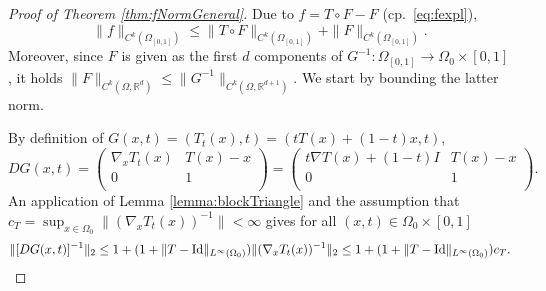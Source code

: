 \begin{proof}[Proof of Theorem \ref{thm:fNormGeneral}]
  Due to $f=T\circ F-F$ (cp.~\eqref{eq:fexpl}),
  \begin{equation}\label{eq:ftriangle}
    \|f\|_{C^k(\Omega_{[0,1]})} \leq \|T\circ F\|_{C^k(\Omega_{[0,1]})} + \|F\|_{C^k(\Omega_{[0,1]})}.
  \end{equation}
  Moreover, since $F$ is given as the first $d$ components of
  $G^{-1}:\Omega_{[0,1]}\to\Omega_0\times [0,1]$, it holds
  $\|F\|_{C^k(\Omega, \mathbb{R}^d)} \leq
  \|G^{-1}\|_{C^k(\Omega,\mathbb{R}^{d+1})}$.
  We start by bounding the latter norm.
  
  By definition of $G(x,t)=(T_t(x),t)=(tT(x)+(1-t)x,t)$,
  \begin{equation*}
    DG(x,t)=
        \begin{pmatrix}
          \nabla_x T_t(x)& T(x) - x \\
      0 & 1 \\
      \end{pmatrix}=
    \begin{pmatrix}
      t\nabla T(x) + (1-t)I & T(x) - x \\
      0 & 1 \\
      \end{pmatrix}.
    \end{equation*}
    An application of
    Lemma \ref{lemma:blockTriangle} and the assumption that
    $c_T=\sup_{x\in\Omega_0}\|(\nabla_xT_t(x))^{-1}\|<\infty$ gives for
    all $(x,t)\in \Omega_0\times [0,1]$
\begin{equation*}
  \|[DG(x,t)]^{-1}\|_{2}
  \le 1+(1+\|T-{\rm Id}\|_{L^\infty(\Omega_0)})\|(\nabla_xT_t(x))^{-1}\|_{2}
  \le 1+(1+\|T-{\rm Id}\|_{L^\infty(\Omega_0)}) c_T.
\end{equation*}


\end{proof}
